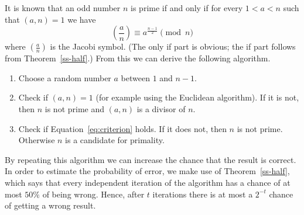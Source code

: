 \documentclass[12pt]{article}
\newcommand{\jacobi}[2]{{\genfrac{(}{)}{}{}{#1}{#2}}}
\theoremstyle{definition}
\begin{document}
It is known that an odd number $n$ is prime if and only if for every $1<a<n$ such that $(a,n)=1$ we have
\begin{equation}\label{eq:criterion}
\jacobi{a}{n}\equiv a^{\frac{n-1}{2}}\pmod n
\end{equation}
where $\jacobi{a}{n}$ is the Jacobi symbol. (The only if part is obvious; the if part follows from Theorem~\ref{ss-half}.) From this we can derive the following algorithm.
\begin{enumerate}
\item Choose a random number $a$ between $1$ and $n-1$.
\item Check if $(a,n)=1$ (for example using the Euclidean algorithm). If it is not, then $n$ is not prime and $(a,n)$ is a divisor of $n$.
\item Check if Equation~\eqref{eq:criterion} holds. If it does not, then $n$ is not prime. Otherwise $n$ is a candidate for primality.
\end{enumerate}
By repeating this algorithm we can increase the chance that the result is correct. In order to estimate the probability of error, we make use of Theorem~\ref{ss-half}, which says that every independent iteration of the algorithm has a chance of at most $50\%$ of being wrong. Hence, after $t$ iterations there is at most a $2^{-t}$ chance of getting a wrong result.
\end{document}
